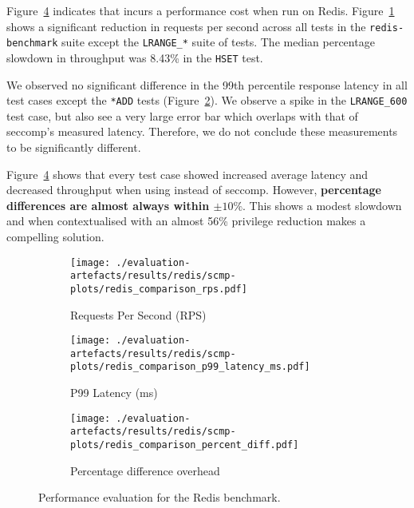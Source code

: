 Figure~\ref{fig:redis-perf} indicates that \af incurs a performance cost when
run on Redis. Figure~\ref{fig:redis-rps} shows a significant reduction in
requests per second across all tests in the \texttt{redis-benchmark} suite
except the \texttt{LRANGE\_*} suite of tests. The median percentage slowdown in
throughput was 8.43\% in the \texttt{HSET} test.

We observed no significant difference in the 99th percentile response
latency in all test cases except the \texttt{*ADD} tests 
(Figure~\ref{fig:redis-p99}). We observe a spike in the \texttt{LRANGE\_600}
test case, but also see a very large error bar which overlaps with that of
seccomp's measured latency. Therefore, we do not conclude these measurements to
be significantly different.

Figure~\ref{fig:redis-perf} shows that every test case showed increased
average latency and decreased throughput when using \af instead of seccomp.
However, \textbf{percentage differences are almost always within $\pm 10\%$}.
This shows a modest slowdown and when contextualised with an almost 56\%
privilege reduction makes \af a compelling solution.

\begin{figure}[htbp]
    \centering
    \begin{subfigure}[b]{\textwidth}
        \centering
        \texttt{[image: ./evaluation-artefacts/results/redis/scmp-plots/redis\_comparison\_rps.pdf]} 
        \caption{Requests Per Second (RPS)}
        \label{fig:redis-rps}
    \end{subfigure}
    \hfill
     \begin{subfigure}[b]{\textwidth}
        \centering
        \texttt{[image: ./evaluation-artefacts/results/redis/scmp-plots/redis\_comparison\_p99\_latency\_ms.pdf]} 
        \caption{P99 Latency (ms)}
        \label{fig:redis-p99}
    \end{subfigure}
    
     \medskip 
     \begin{subfigure}[b]{1.2\textwidth}
        \centering
        \texttt{[image: ./evaluation-artefacts/results/redis/scmp-plots/redis\_comparison\_percent\_diff.pdf]} %
        \caption{Percentage difference overhead}
        \label{fig:redis-percdiff}
    \end{subfigure}

    \caption{Performance evaluation for the Redis benchmark.}
    \label{fig:redis-perf}
\end{figure}

